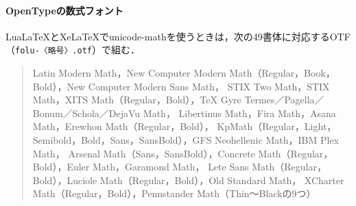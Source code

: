 \documentclass[dvipdfmx,paper=a4]{jlreq}
\newcommand\pkg[1]{\textsf{#1}}
\newcommand\file[1]{\texttt{#1}}
\begin{document}
\paragraph{OpenTypeの数式フォント}
Lua\LaTeX{}とXe\LaTeX{}で\pkg{unicode-math}を使うときは，次の49書体に対応するOTF
（\file{folu-〈略号〉.otf}）で組む．
\begin{quote}\small
Latin Modern Math，New Computer Modern Math（Regular，Book，Bold），New Computer Modern Sans Math，
STIX Two Math，STIX Math，XITS Math（Regular，Bold），\TeX{} Gyre Termes／Pagella／Bonum／Schola／DejaVu Math，
Libertinus Math，Fira Math，Asana Math，Erewhon Math（Regular，Bold），
KpMath（Regular，Light，Semibold，Bold，Sans，SansBold），GFS Neohellenic Math，IBM Plex Math，
Arsenal Math（Sans，SansBold），Concrete Math（Regular，Bold），Euler Math，Garamond Math，
Lete Sans Math（Regular，Bold），Luciole Math（Regular，Bold），Old Standard Math，
XCharter Math（Regular，Bold），Pennstander Math（Thin〜Blackの9つ）
\end{quote}
\end{document}

